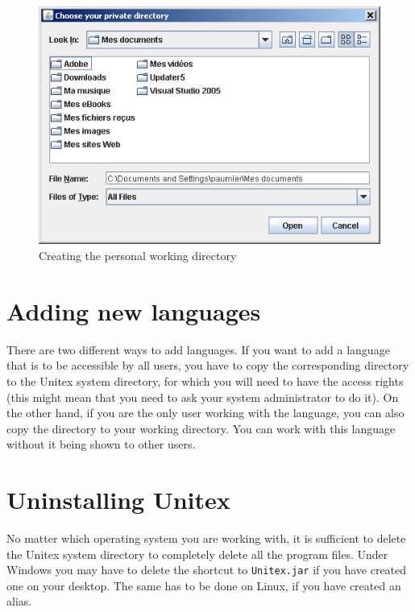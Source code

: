 \begin{figure}[!ht]
\begin{center}
\includegraphics[width=13cm]{resources/img/fig1-3.png}
\caption{Creating the personal working
directory\label{fig-creation-personal-directory}}
\end{center}
\end{figure}



\section{Adding new languages}

\bigskip
\noindent There are two different ways to add languages. If you want to add 
a language that is to be accessible by all  users, you have to copy the 
corresponding directory to the Unitex system directory, for which 
you will need to have the access rights  (this might mean that you need to 
ask your system administrator to do it). On the other hand, if you are the only user working
with the language, you can also copy the directory to your working 
directory.
You can work with this language without it being shown to other users.


\section{Uninstalling Unitex}
No matter which operating system you are working with, it is sufficient to delete 
the Unitex system directory to completely delete all the program files. Under
Windows you may have to delete the shortcut to \verb+Unitex.jar+  
if you have created one on your desktop. The same has to be done on Linux, if you have 
created an alias.


